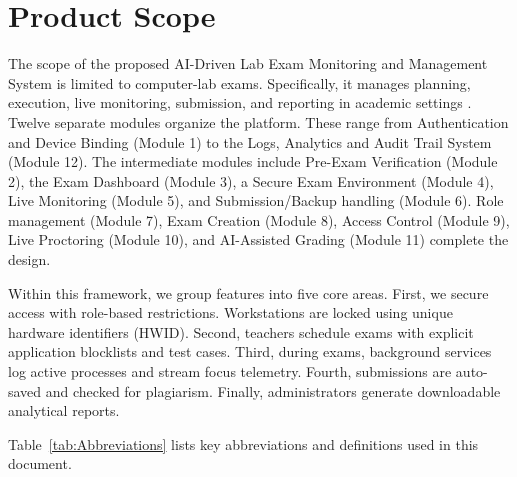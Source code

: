 \section{Product Scope}

The scope of the proposed AI-Driven Lab Exam Monitoring and Management System is limited to computer-lab exams. Specifically, it manages planning, execution, live monitoring, submission, and reporting in academic settings \cite{scope1}. Twelve separate modules organize the platform. These range from Authentication and Device Binding (Module 1) to the Logs, Analytics and Audit Trail System (Module 12). The intermediate modules include Pre-Exam Verification (Module 2), the Exam Dashboard (Module 3), a Secure Exam Environment (Module 4), Live Monitoring (Module 5), and Submission/Backup handling (Module 6). Role management (Module 7), Exam Creation (Module 8), Access Control (Module 9), Live Proctoring (Module 10), and AI-Assisted Grading (Module 11) complete the design.

Within this framework, we group features into five core areas. First, we secure access with role-based restrictions. Workstations are locked using unique hardware identifiers (HWID). Second, teachers schedule exams with explicit application blocklists and test cases. Third, during exams, background services log active processes and stream focus telemetry. Fourth, submissions are auto-saved and checked for plagiarism. Finally, administrators generate downloadable analytical reports.

Table~\ref{tab:Abbreviations} lists key abbreviations and definitions used in this document.

